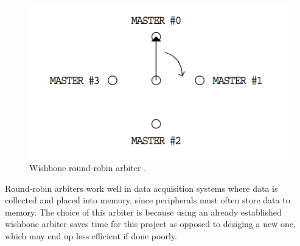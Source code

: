 %
%
\begin{figure}[htb]
    \centering
    \includegraphics[width=1.0\textwidth]{Figures/Tile/WBArbiter}
    \caption{Wishbone round-robin arbiter \cite{WBLibrary}.}
    \label{fig:WBArbiter}
\end{figure}

Round-robin arbiters work well in data acquisition systems where data is collected and placed into memory, since peripherals must often store data to memory.
The choice of this arbiter is because using an already established wishbone arbiter saves time for this project as opposed to desiging a new one, which may end up less efficient if done poorly.


